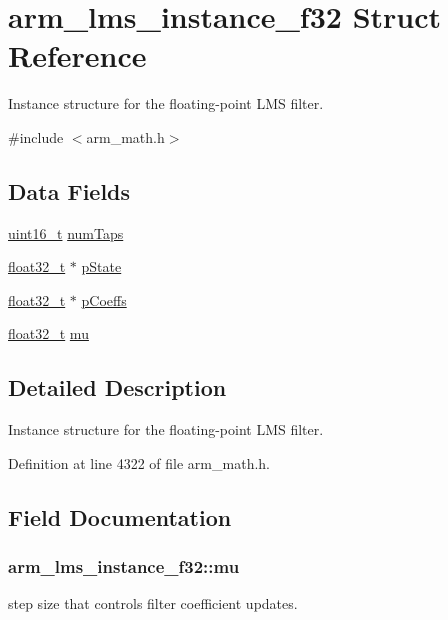 \hypertarget{structarm__lms__instance__f32}{\section{arm\-\_\-lms\-\_\-instance\-\_\-f32 Struct Reference}
\label{structarm__lms__instance__f32}
}


Instance structure for the floating-\/point L\-M\-S filter.  




{\ttfamily \#include $<$arm\-\_\-math.\-h$>$}

\subsection*{Data Fields}
\begin{DoxyCompactItemize}
\item 
\hyperlink{stdint_8h_a273cf69d639a59973b6019625df33e30}{uint16\-\_\-t} \hyperlink{structarm__lms__instance__f32_af73880d9009982f5d14529869494ec3d}{num\-Taps}
\item 
\hyperlink{arm__math_8h_a4611b605e45ab401f02cab15c5e38715}{float32\-\_\-t} $\ast$ \hyperlink{structarm__lms__instance__f32_aaf94285be2f99b5b9af40bea8dcb14b9}{p\-State}
\item 
\hyperlink{arm__math_8h_a4611b605e45ab401f02cab15c5e38715}{float32\-\_\-t} $\ast$ \hyperlink{structarm__lms__instance__f32_a4795c6f7d3f17cec15c2fd09f66edd1a}{p\-Coeffs}
\item 
\hyperlink{arm__math_8h_a4611b605e45ab401f02cab15c5e38715}{float32\-\_\-t} \hyperlink{structarm__lms__instance__f32_ae2af43d74c93dba16b876e10c97a5b99}{mu}
\end{DoxyCompactItemize}


\subsection{Detailed Description}
Instance structure for the floating-\/point L\-M\-S filter. 

Definition at line 4322 of file arm\-\_\-math.\-h.



\subsection{Field Documentation}
\hypertarget{structarm__lms__instance__f32_ae2af43d74c93dba16b876e10c97a5b99}{
\subsubsection[{mu}]{ arm\-\_\-lms\-\_\-instance\-\_\-f32\-::mu}}\label{structarm__lms__instance__f32_ae2af43d74c93dba16b876e10c97a5b99}
step size that controls filter coefficient updates. 

